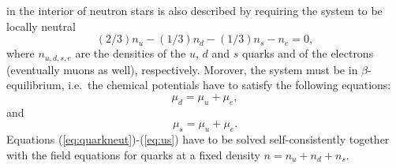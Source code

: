 \documentclass[%
oneside,                 %
final,                   %
10pt]{article}
\begin{document}
in the interior of neutron stars is also described by
requiring the system to be locally neutral
\begin{equation} 
    \label{eq:quarkneut}
    (2/3)n_u -(1/3)n_d - (1/3)n_s - n_e = 0,
\end{equation}
where $n_{u,d,s,e}$ 
are the densities of the $u$, $d$ and $s$ quarks and of the
electrons (eventually muons as well), respectively. 
Morover, the system must be in $\beta$-equilibrium, i.e.\ 
the chemical potentials have to satisfy the following equations:
\begin{equation}
      \label{eq:ud}
      \mu_d=\mu_u+\mu_e,
\end{equation}
and
\begin{equation}
      \label{eq:us}
      \mu_s=\mu_u+\mu_e .
\end{equation}
Equations (\ref{eq:quarkneut})-(\ref{eq:us}) have to be solved 
self-consistently together with the field equations for quarks 
at a fixed density $n=n_u+n_d+n_s$.
\end{document}
